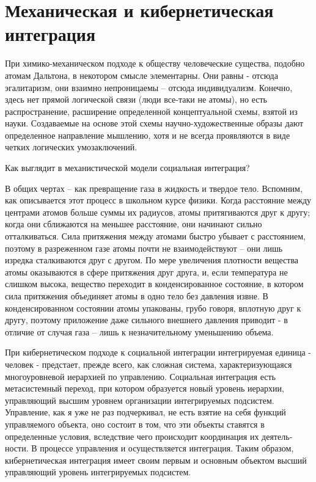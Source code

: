 \documentclass{book}
\begin{document}
\section{Механическая и кибернетическая интеграция}

При химико-механическом подходе к обществу человече­ские существа, подобно атомам Дальтона, в некотором смысле элементарны.  Они равны - отсюда эгалитаризм, они взаимно непроницаемы -- отсюда индивидуализм. Конечно, здесь нет прямой логической связи (люди все-таки не атомы), но есть распространение, расширение определенной концептуальной схе­мы, взятой из науки. Создаваемые на основе этой схемы науч­но-художественные образы дают определенное направление мышлению, хотя и не всегда проявляются в виде четких ло­гических умозаключений.

Как выглядит в механистической модели социальная интег­рация?

В общих чертах -- как превращение газа в жидкость и твер­дое тело. Вспомним, как описывается этот процесс в школь­ном курсе физики. Когда расстояние между центрами атомов больше суммы их радиусов, атомы притягиваются друг к другу; когда они сближаются на меньшее расстояние, они начи­нают сильно отталкиваться. Сила притяжения между атомами быстро убывает с расстоянием, поэтому в разреженном газе атомы почти не взаимодействуют -- они лишь изредка сталки­ваются друг с другом. По мере увеличения плотности вещест­ва атомы оказываются в сфере притяжения друг друга, и, если температура не слишком высока, вещество переходит в кон­денсированное состояние, в котором сила притяжения объе­диняет атомы в одно тело без давления извне. В конденсиро­ванном состоянии атомы упакованы, грубо говоря, вплотную друг к другу, поэтому приложение даже сильного внешнего давления приводит - в отличие от случая газа -- лишь к незна­чительному уменьшению объема.

При кибернетическом подходе к социальной интеграции ин­тегрируемая единица - человек - предстает, прежде всего, как сложная система,  характеризующаяся многоуровневой иерархией по управлению. Социальная интеграция есть метасистемный переход, при котором образуется новый уровень иерархии, управляющий высшим уровнем организации интег­рируемых подсистем. Управление, как я уже не раз подчерки­вал, не есть взятие на себя функций управляемого объекта, оно состоит в том, что эти объекты ставятся в определенные условия, вследствие чего происходит координация их деятель­ности. В процессе управления и осуществляется интеграция. Таким образом, кибернетическая интеграция имеет своим пер­вым и основным объектом высший управляющий уровень ин­тегрируемых подсистем.
\end{document}
